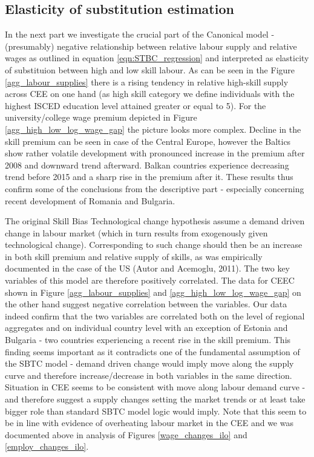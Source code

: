 \documentclass{article}
\begin{document}
\subsection{Elasticity of substitution estimation}
In the next part we investigate the crucial part of the Canonical model - (presumably) negative relationship between relative labour supply and relative wages as outlined in equation \ref{eqn:STBC_regression} and interpreted as elasticity of substituion between high and low skill labour. As can be seen in the Figure \ref{agg_labour_supplies} there is a rising tendency in relative high-skill supply across CEE on one hand (as high skill category we define individuals with the highest ISCED education level attained greater or equal to 5). For the university/college wage premium depicted in Figure \ref{agg_high_low_log_wage_gap} the picture looks more complex. Decline in the skill premium can be seen in case of the Central Europe, however the Baltics show rather volatile development with pronounced increase in the premium after 2008 and downward trend afterward. Balkan countries experience decreasing trend before 2015 and a sharp rise in the premium after it. These results thus confirm some of the conclusions from the descriptive part - especially concerning recent development of Romania and Bulgaria.

The original Skill Bias Technological change hypothesis assume a demand driven change in labour market (which in turn results from exogenously given technological change). Corresponding to such change should then be an increase in both skill premium and relative supply of skills, as was empirically documented in the case of the US (Autor and Acemoglu, 2011). The two key variables of this model are therefore positively correlated. The data for CEEC shown in Figure \ref{agg_labour_supplies} and \ref{agg_high_low_log_wage_gap} on the other hand suggest negative correlation between the variables. 
Our data indeed confirm that the two variables are correlated both on the level of regional aggregates and on individual country level with an exception of Estonia and Bulgaria - two countries experiencing a recent rise in the skill premium. %
This finding seems important as it contradicts one of the fundamental assumption of the SBTC model - demand driven change would imply move along the supply curve and therefore increase/decrease in both variables in the same direction. Situation in CEE seems to be consistent with move along labour demand curve - and therefore suggest a supply changes setting the market trends or at least take bigger role than standard SBTC model logic would imply. Note that this seem to be in line with evidence of overheating labour market in the CEE and we was documented above in analysis of Figures \ref{wage_changes_ilo} and \ref{employ_changes_ilo}.
\end{document}

